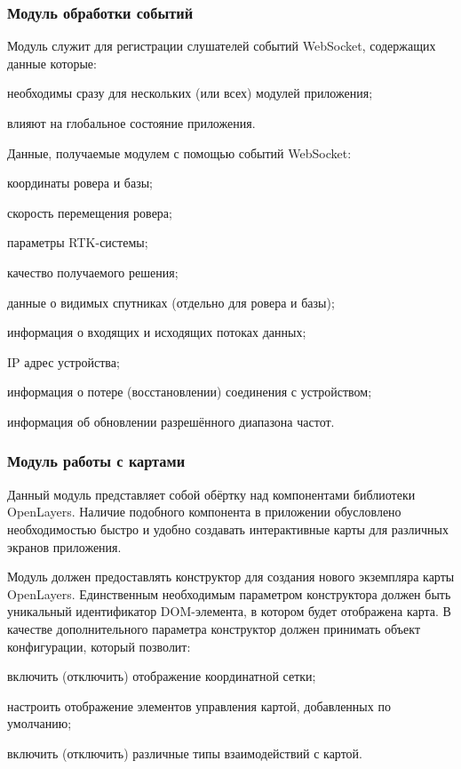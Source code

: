 \subsubsection{Модуль обработки событий}

Модуль служит для регистрации слушателей событий WebSocket, содержащих данные которые:
\begin{dashitemize}
  \item необходимы сразу для нескольких (или всех) модулей приложения;
  \item влияют на глобальное состояние приложения.
\end{dashitemize}

Данные, получаемые модулем с помощью событий WebSocket:
\begin{dashitemize}
  \item координаты ровера и базы;
  \item скорость перемещения ровера;
  \item параметры RTK-системы;
  \item качество получаемого решения;
  \item данные о видимых спутниках (отдельно для ровера и базы);
  \item информация о входящих и исходящих потоках данных;
  \item IP адрес устройства;
  \item информация о потере (восстановлении) соединения с устройством;
  \item информация об обновлении разрешённого диапазона частот.
\end{dashitemize}


\subsubsection{Модуль работы с картами}

Данный модуль представляет собой обёртку над компонентами библиотеки OpenLayers. Наличие подобного компонента в приложении обусловлено необходимостью быстро и удобно создавать интерактивные карты для различных экранов приложения.

Модуль должен предоставлять конструктор для создания нового экземпляра карты OpenLayers. Единственным необходимым параметром конструктора должен быть уникальный идентификатор DOM-элемента, в котором будет отображена карта. В качестве дополнительного параметра конструктор должен принимать объект конфигурации, который позволит:
\begin{dashitemize}
  \item включить (отключить) отображение координатной сетки;
  \item настроить отображение элементов управления картой, добавленных по умолчанию;
  \item включить (отключить) различные типы взаимодействий с картой.
\end{dashitemize}


